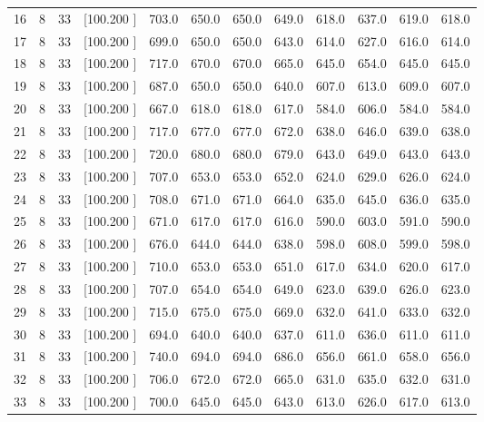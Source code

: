 \documentclass[12pt,a4paper]{article}
\begin{document}
\begin{center}
{\begin{tabular}{r r r r r r r r r r r r}
  16&  8& 33&[100.200   ]&   703.0&   650.0&   650.0&   649.0&   618.0&   637.0&   619.0&   618.0\\[-0.02in]
  17&  8& 33&[100.200   ]&   699.0&   650.0&   650.0&   643.0&   614.0&   627.0&   616.0&   614.0\\[-0.02in]
  18&  8& 33&[100.200   ]&   717.0&   670.0&   670.0&   665.0&   645.0&   654.0&   645.0&   645.0\\[-0.02in]
  19&  8& 33&[100.200   ]&   687.0&   650.0&   650.0&   640.0&   607.0&   613.0&   609.0&   607.0\\[-0.02in]
  20&  8& 33&[100.200   ]&   667.0&   618.0&   618.0&   617.0&   584.0&   606.0&   584.0&   584.0\\[-0.02in]
  21&  8& 33&[100.200   ]&   717.0&   677.0&   677.0&   672.0&   638.0&   646.0&   639.0&   638.0\\[-0.02in]
  22&  8& 33&[100.200   ]&   720.0&   680.0&   680.0&   679.0&   643.0&   649.0&   643.0&   643.0\\[-0.02in]
  23&  8& 33&[100.200   ]&   707.0&   653.0&   653.0&   652.0&   624.0&   629.0&   626.0&   624.0\\[-0.02in]
  24&  8& 33&[100.200   ]&   708.0&   671.0&   671.0&   664.0&   635.0&   645.0&   636.0&   635.0\\[-0.02in]
  25&  8& 33&[100.200   ]&   671.0&   617.0&   617.0&   616.0&   590.0&   603.0&   591.0&   590.0\\[-0.02in]
  26&  8& 33&[100.200   ]&   676.0&   644.0&   644.0&   638.0&   598.0&   608.0&   599.0&   598.0\\[-0.02in]
  27&  8& 33&[100.200   ]&   710.0&   653.0&   653.0&   651.0&   617.0&   634.0&   620.0&   617.0\\[-0.02in]
  28&  8& 33&[100.200   ]&   707.0&   654.0&   654.0&   649.0&   623.0&   639.0&   626.0&   623.0\\[-0.02in]
  29&  8& 33&[100.200   ]&   715.0&   675.0&   675.0&   669.0&   632.0&   641.0&   633.0&   632.0\\[-0.02in]
  30&  8& 33&[100.200   ]&   694.0&   640.0&   640.0&   637.0&   611.0&   636.0&   611.0&   611.0\\[-0.02in]
  31&  8& 33&[100.200   ]&   740.0&   694.0&   694.0&   686.0&   656.0&   661.0&   658.0&   656.0\\[-0.02in]
  32&  8& 33&[100.200   ]&   706.0&   672.0&   672.0&   665.0&   631.0&   635.0&   632.0&   631.0\\[-0.02in]
  33&  8& 33&[100.200   ]&   700.0&   645.0&   645.0&   643.0&   613.0&   626.0&   617.0&   613.0\\[-0.02in]

\end{tabular}}
\end{center}
\end{document}
